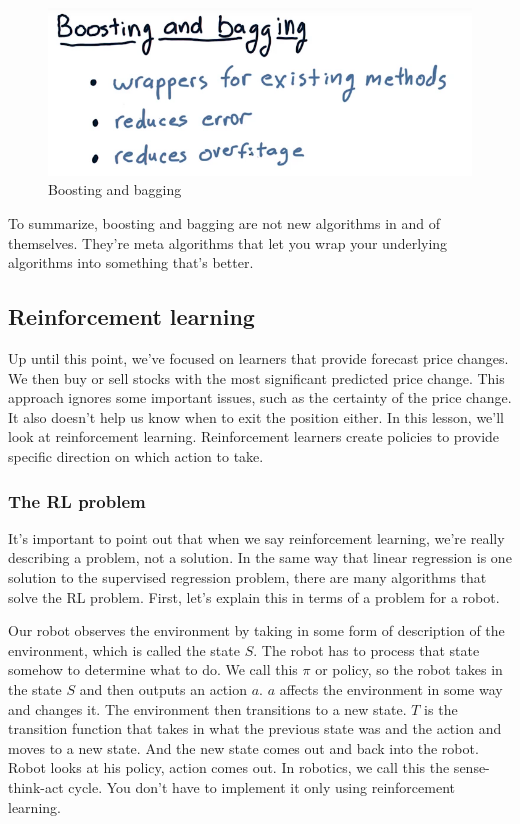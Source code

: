 \documentclass[12pt]{article}
\begin{document}
\begin{figure}[!ht]
\centering
\includegraphics[scale=0.4]{fig/fig97}
\caption{Boosting and bagging}
\end{figure}

To summarize, boosting and bagging are not new algorithms in and of themselves. They're meta algorithms that let you wrap your underlying algorithms into something that's better. 

\subsection{Reinforcement learning}

Up until this point, we've focused on learners that provide forecast price changes. We then buy or sell stocks with the most significant predicted price change. This approach ignores some important issues, such as the certainty of the price change. It also doesn't help us know when to exit the position either. In this lesson, we'll look at reinforcement learning. Reinforcement learners create policies to provide specific direction on which action to take. 

\subsubsection{The RL problem}

It's important to point out that when we say reinforcement learning, we're really describing a problem, not a solution. In the same way that linear regression is one solution to the supervised regression problem, there are many algorithms that solve the RL problem. First, let's explain this in terms of a problem for a robot. 

Our robot observes the environment by taking in some form of description of the environment, which is called the state $S$. The robot has to process that state somehow to determine what to do. We call this $\pi$ or policy, so the robot takes in the state $S$ and then outputs an action $a$. $a$ affects the environment in some way and changes it. The environment then transitions to a new state. $T$ is the transition function that takes in what the previous state was and the action and moves to a new state. And the new state comes out and back into the robot. Robot looks at his policy, action comes out. In robotics, we call this the sense-think-act cycle. You don't have to implement it only using reinforcement learning. 
\end{document}
